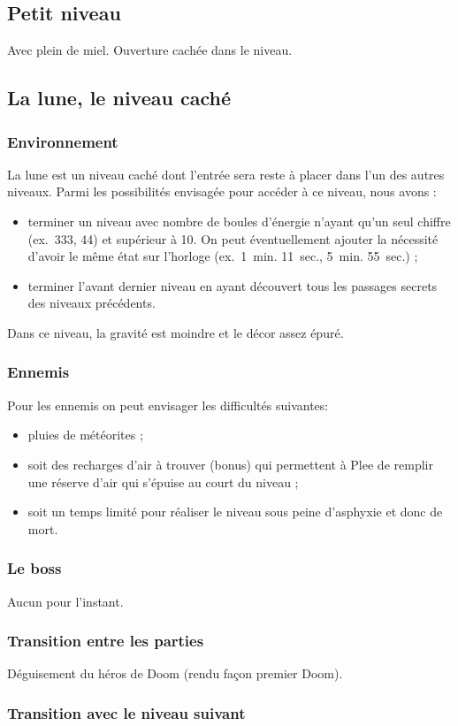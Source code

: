 \documentclass{article}
\begin{document}
\subsection{Petit niveau}
Avec plein de miel. Ouverture cachée dans le niveau.

\subsection{La lune, le niveau caché}
\subsubsection{Environnement}
La lune est un niveau caché dont l'entrée sera reste à placer
dans l'un des autres niveaux. Parmi les possibilités envisagée pour
accéder à ce niveau, nous avons :
\begin{itemize}
\item terminer un niveau avec nombre de boules d'énergie n'ayant
qu'un seul chiffre (ex.~333, 44) et supérieur à 10. On peut
éventuellement ajouter la nécessité d'avoir le même état sur l'horloge
(ex.~1~min. 11~sec., 5~min. 55~sec.) ;
\item terminer l'avant dernier niveau en ayant découvert tous les
passages secrets des niveaux précédents.
\end{itemize}

Dans ce niveau, la gravité est moindre et le décor assez épuré.

\subsubsection{Ennemis}
Pour les ennemis on peut envisager les difficultés suivantes:
\begin{itemize}
\item pluies de météorites ;
\item soit des recharges d'air à trouver (bonus) qui permettent à Plee
      de remplir une réserve d'air qui s'épuise au court du niveau ;
\item soit un temps limité pour réaliser le niveau sous peine
      d'asphyxie et donc de mort.
\end{itemize}

\subsubsection{Le boss}
Aucun pour l'instant.

\subsubsection{Transition entre les parties}
Déguisement du héros de Doom (rendu fa\c con premier Doom).

\subsubsection{Transition avec le niveau suivant}
\end{document}
